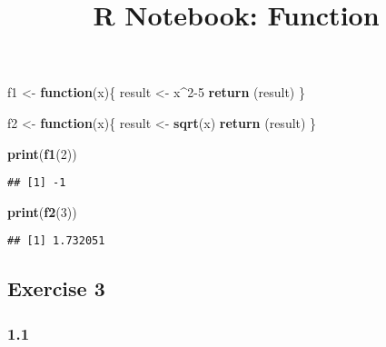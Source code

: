 \documentclass[
]{article}
\title{R Notebook: Function}
\author{}
\date{\vspace{-2.5em}}
\newenvironment{Shaded}{\begin{snugshade}}{\end{snugshade}}
\newcommand{\CommentTok}[1]{\textcolor[rgb]{0.56,0.35,0.01}{\textit{#1}}}
\newcommand{\ControlFlowTok}[1]{\textcolor[rgb]{0.13,0.29,0.53}{\textbf{#1}}}
\newcommand{\DecValTok}[1]{\textcolor[rgb]{0.00,0.00,0.81}{#1}}
\newcommand{\KeywordTok}[1]{\textcolor[rgb]{0.13,0.29,0.53}{\textbf{#1}}}
\newcommand{\NormalTok}[1]{#1}
\newcommand{\OperatorTok}[1]{\textcolor[rgb]{0.81,0.36,0.00}{\textbf{#1}}}
\newcommand{\StringTok}[1]{\textcolor[rgb]{0.31,0.60,0.02}{#1}}
\begin{document}
\maketitle

\begin{Shaded}
\begin{Highlighting}[]
\NormalTok{f1 <-}\StringTok{ }\ControlFlowTok{function}\NormalTok{(x)\{}
\NormalTok{  result <-}\StringTok{ }\NormalTok{x}\OperatorTok{^}\DecValTok{2-5}
  \KeywordTok{return}\NormalTok{ (result)}
\NormalTok{\}}

\NormalTok{f2 <-}\StringTok{ }\ControlFlowTok{function}\NormalTok{(x)\{}
\NormalTok{  result <-}\StringTok{ }\KeywordTok{sqrt}\NormalTok{(x)}
  \KeywordTok{return}\NormalTok{ (result)}
\NormalTok{\}}
\end{Highlighting}
\end{Shaded}

\begin{Shaded}
\begin{Highlighting}[]
\KeywordTok{print}\NormalTok{(}\KeywordTok{f1}\NormalTok{(}\DecValTok{2}\NormalTok{))}
\end{Highlighting}
\end{Shaded}

\begin{verbatim}
## [1] -1
\end{verbatim}

\begin{Shaded}
\begin{Highlighting}[]
\KeywordTok{print}\NormalTok{(}\KeywordTok{f2}\NormalTok{(}\DecValTok{3}\NormalTok{))}
\end{Highlighting}
\end{Shaded}

\begin{verbatim}
## [1] 1.732051
\end{verbatim}

\hypertarget{exercise-3}{%
\subsection{Exercise 3}\label{exercise-3}}

\hypertarget{section}{%
\subsubsection{1.1}\label{section}}

\begin{Shaded}
\end{Shaded}
\end{document}
